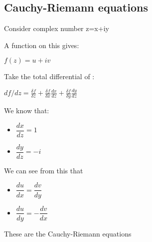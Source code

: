 
\subsection{Cauchy-Riemann equations}

Consider complex number z=x+iy

A function on this gives:

\(f(z)=u+iv\)

Take the total differential of :

\(df/dz=\frac{\delta f}{\delta z}+\frac{\delta f}{\delta x}\frac{dx}{dz}+\frac{\delta f}{\delta y}\frac{dy}{dz}\)

We know that:

\begin{itemize}
\item \(\dfrac{dx}{dz}=1\)
\item \(\dfrac{dy}{dz}=-i\)
\end{itemize}

We can see from this that

\begin{itemize}
\item \(\dfrac{du}{dx}=\dfrac{dv}{dy}\)
\item \(\dfrac{du}{dy}=-\dfrac{dv}{dx}\)
\end{itemize}

These are the Cauchy-Riemann equations

